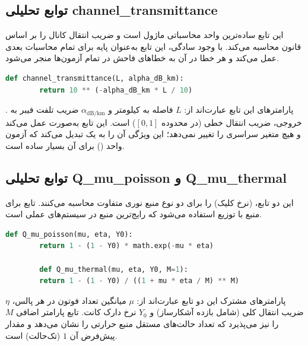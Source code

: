 \subsection{توابع تحلیلی channel\_transmittance}

این تابع ساده‌ترین واحد محاسباتی ماژول است و ضریب انتقال کانال را بر اساس قانون  محاسبه می‌کند. با وجود سادگی، این تابع به‌عنوان  پایه برای تمام محاسبات بعدی عمل می‌کند و هر خطا در آن به خطاهای فاحش در تمام آزمون‌ها منجر می‌شود.

\begin{LTR}
	\begin{lstlisting}[language=Python]
		def channel_transmittance(L, alpha_dB_km):
		return 10 ** (-alpha_dB_km * L / 10)
	\end{lstlisting}
\end{LTR}

پارامترهای این تابع عبارت‌اند از: $L$ فاصله به کیلومتر و $\alpha_{\text{dB/km}}$ ضریب تلفت فیبر به . خروجی، ضریب انتقال خطی (در محدوده $[0, 1]$) است. این تابع به‌صورت  عمل می‌کند و هیچ متغیر سراسری را تغییر نمی‌دهد؛ این ویژگی آن را به یک  تبدیل می‌کند که آزمون واحد () برای آن بسیار ساده است.

\subsection{توابع تحلیلی Q\_mu\_poisson و Q\_mu\_thermal}

این دو تابع،  (نرخ کلیک) را برای دو نوع منبع نوری متفاوت محاسبه می‌کنند. تابع  برای منبع  با توزیع  استفاده می‌شود که رایج‌ترین منبع در سیستم‌های  عملی است.

\begin{LTR}
	\begin{lstlisting}[language=Python]
		def Q_mu_poisson(mu, eta, Y0):
		return 1 - (1 - Y0) * math.exp(-mu * eta)
		
		def Q_mu_thermal(mu, eta, Y0, M=1):
		return 1 - (1 - Y0) / ((1 + mu * eta / M) ** M)
	\end{lstlisting}
\end{LTR}

پارامترهای مشترک این دو تابع عبارت‌اند از: $\mu$ میانگین تعداد فوتون در هر پالس، $\eta$ ضریب انتقال کلی (شامل بازده آشکارساز) و $Y_0$ نرخ دارک کانت. تابع  پارامتر اضافی $M$ را نیز می‌پذیرد که تعداد حالت‌های مستقل منبع حرارتی را نشان می‌دهد و مقدار پیش‌فرض آن $1$ (تک‌حالت) است.

